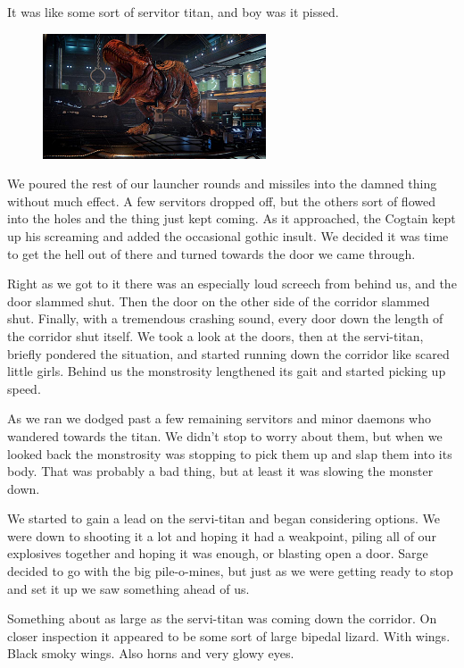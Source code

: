 It was like some sort of servitor titan, and boy was it pissed.

\begin{figure}
	\begin{center}
		\includegraphics[width=\figwidth]{pics/7/43.png}
	\end{center}
\end{figure}
We poured the rest of our launcher rounds and missiles into the damned thing without much effect. 
A few servitors dropped off, but the others sort of flowed into the holes and the thing just kept coming. 
As it approached, the Cogtain kept up his screaming and added the occasional gothic insult. 
We decided it was time to get the hell out of there and turned towards the door we came through.

Right as we got to it there was an especially loud screech from behind us, and the door slammed shut. 
Then the door on the other side of the corridor slammed shut. 
Finally, with a tremendous crashing sound, every door down the length of the corridor shut itself. 
We took a look at the doors, then at the servi-titan, briefly pondered the situation, and started running down the corridor like scared little girls. 
Behind us the monstrosity lengthened its gait and started picking up speed.

As we ran we dodged past a few remaining servitors and minor daemons who wandered towards the titan. 
We didn’t stop to worry about them, but when we looked back the monstrosity was stopping to pick them up and slap them into its body. 
That was probably a bad thing, but at least it was slowing the monster down.

We started to gain a lead on the servi-titan and began considering options. 
We were down to shooting it a lot and hoping it had a weakpoint, piling all of our explosives together and hoping it was enough, or blasting open a door. 
Sarge decided to go with the big pile-o-mines, but just as we were getting ready to stop and set it up we saw something ahead of us.

Something about as large as the servi-titan was coming down the corridor. 
On closer inspection it appeared to be some sort of large bipedal lizard. 
With wings. 
Black smoky wings. 
Also horns and very glowy eyes.

